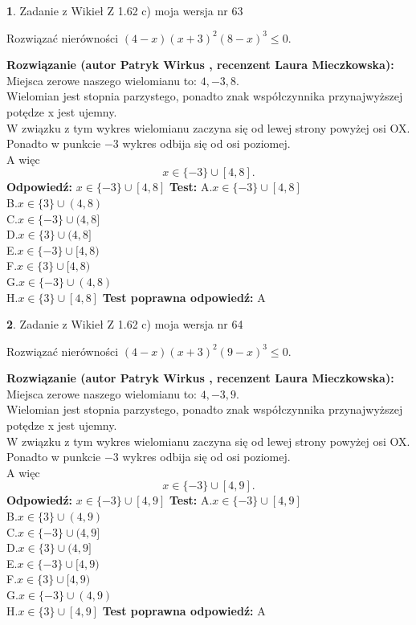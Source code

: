 \documentclass[12pt, a4paper]{article}
\theoremstyle{definition} %
\newtheorem{zad}{}
\newcommand{\zadStart}[1]{\begin{zad}#1\newline}
\newcommand{\zadStop}{\end{zad}}
\newcommand{\rozwStart}[2]{\noindent \textbf{Rozwiązanie (autor #1 , recenzent #2): }\newline}
\newcommand{\rozwStop}{\newline}
\newcommand{\odpStart}{\noindent \textbf{Odpowiedź:}\newline}
\newcommand{\odpStop}{\newline}
\newcommand{\testStart}{\noindent \textbf{Test:}\newline}
\newcommand{\testStop}{\newline}
\newcommand{\kluczStart}{\noindent \textbf{Test poprawna odpowiedź:}\newline}
\newcommand{\kluczStop}{\newline}
\begin{document}
\zadStart{Zadanie z Wikieł Z 1.62 c) moja wersja nr 63}

Rozwiązać nierówności $(4-x)(x+3)^{2}(8-x)^{3}\le0$.
\zadStop
\rozwStart{Patryk Wirkus}{Laura Mieczkowska}
Miejsca zerowe naszego wielomianu to: $4, -3, 8$.\\
Wielomian jest stopnia parzystego, ponadto znak współczynnika przy\linebreak najwyższej potędze x jest ujemny.\\ W związku z tym wykres wielomianu zaczyna się od lewej strony powyżej osi OX.\\
Ponadto w punkcie $-3$ wykres odbija się od osi poziomej.\\
A więc $$x \in \{-3\} \cup [4,8].$$
\rozwStop
\odpStart
$x \in \{-3\} \cup [4,8]$
\odpStop
\testStart
A.$x \in \{-3\} \cup [4,8]$\\
B.$x \in \{3\} \cup (4,8)$\\
C.$x \in \{-3\} \cup (4,8]$\\
D.$x \in \{3\} \cup (4,8]$\\
E.$x \in \{-3\} \cup [4,8)$\\
F.$x \in \{3\} \cup [4,8)$\\
G.$x \in \{-3\} \cup (4,8)$\\
H.$x \in \{3\} \cup [4,8]$
\testStop
\kluczStart
A
\kluczStop



\zadStart{Zadanie z Wikieł Z 1.62 c) moja wersja nr 64}

Rozwiązać nierówności $(4-x)(x+3)^{2}(9-x)^{3}\le0$.
\zadStop
\rozwStart{Patryk Wirkus}{Laura Mieczkowska}
Miejsca zerowe naszego wielomianu to: $4, -3, 9$.\\
Wielomian jest stopnia parzystego, ponadto znak współczynnika przy\linebreak najwyższej potędze x jest ujemny.\\ W związku z tym wykres wielomianu zaczyna się od lewej strony powyżej osi OX.\\
Ponadto w punkcie $-3$ wykres odbija się od osi poziomej.\\
A więc $$x \in \{-3\} \cup [4,9].$$
\rozwStop
\odpStart
$x \in \{-3\} \cup [4,9]$
\odpStop
\testStart
A.$x \in \{-3\} \cup [4,9]$\\
B.$x \in \{3\} \cup (4,9)$\\
C.$x \in \{-3\} \cup (4,9]$\\
D.$x \in \{3\} \cup (4,9]$\\
E.$x \in \{-3\} \cup [4,9)$\\
F.$x \in \{3\} \cup [4,9)$\\
G.$x \in \{-3\} \cup (4,9)$\\
H.$x \in \{3\} \cup [4,9]$
\testStop
\kluczStart
A
\kluczStop
\end{document}
